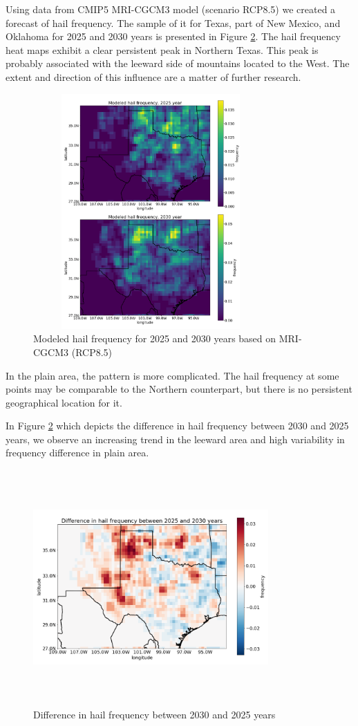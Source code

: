 \documentclass[conference]{IEEEtran}
\begin{document}
Using data from CMIP5 MRI-CGCM3 model (scenario RCP8.5) we created a forecast of hail frequency. The sample of it for Texas, part of New Mexico, and Oklahoma for 2025 and 2030 years is presented in Figure \ref{fig: delta25-30}. The hail frequency heat maps exhibit a clear persistent peak in Northern Texas. This  peak is probably associated with the leeward side of mountains located to the West. The extent and direction of this influence are a matter of further research. 
\begin{figure}[htbp]
\centerline{\includegraphics[width=9cm,height=9cm,keepaspectratio]{modeled25_30.png}}
\caption{Modeled hail frequency for 2025 and 2030 years based on MRI-CGCM3 (RCP8.5)}
\label{fig: modeled25-30}
\end{figure}

In the plain area, the pattern is more complicated. The hail frequency at some points may be comparable to the Northern counterpart, but there is no persistent geographical location for it.

In Figure \ref{fig: delta25-30} which depicts the difference in hail frequency between 2030 and 2025 years, we observe an increasing trend  in the leeward area 
and high variability in frequency difference in plain area.
\begin{figure}[htbp]
\centerline{\includegraphics[width=9cm,height=9cm,keepaspectratio]{delta25_30.png}}
\caption{Difference in hail frequency between 2030 and 2025 years}
\label{fig: delta25-30}
\end{figure}
\end{document}
